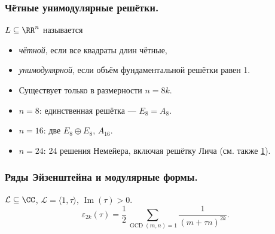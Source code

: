 \documentclass[12pt,a4paper]{article}
\DeclareMathOperator{\Img}{Im}
\DeclareMathOperator{\GCD}{GCD}
\begin{document}
    \subsubsection*{Чётные унимодулярные решётки.}

    \begin{definition}
        $L \subseteq \RR^n$ называется
        \begin{itemize}
            \item \emph{чётной}, если все квадраты длин чётные,
            \item \emph{унимодулярной}, если объём фундаментальной решётки равен 1.
        \end{itemize}
    \end{definition}
    
    \begin{remark}
        \begin{itemize}
            \item Существует только в размерности $n = 8k$.
            \item $n=8$: единственная решётка --- $E_8 = A_8$.
            \item $n=16$: две $E_8 \oplus E_8$, $A_16$.
            \item $n=24$: 24 решения Немейера, включая решётку Лича (см. также \href{http://www.ams.org/notices/201309/rnoti-p1168.pdf}{1}).
        \end{itemize}
    \end{remark}

    \subsubsection*{Ряды Эйзенштейна и модулярные формы.}

    \begin{definition}
        $\mathcal{L} \subseteq \CC$, $\mathcal{L} = \langle 1, \tau \rangle$, $\Img(\tau) > 0$.
        \[\varepsilon_{2k}(\tau) = \frac{1}{2}\sum_{\GCD(m, n) = 1} \frac{1}{(m + \tau n)^{2k}}.\]
    \end{definition}
\end{document}
